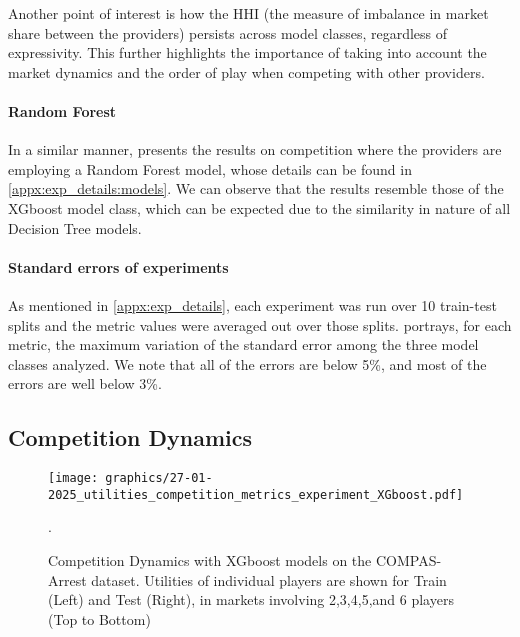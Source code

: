 Another point of interest is how the HHI (the measure of imbalance in market share between the providers) persists across model classes, regardless of expressivity. This further highlights the importance of taking into account the market dynamics and the order of play when competing with other providers.


\paragraph{Random Forest}

In a similar manner,  presents the results on competition where the providers are employing a Random Forest model, whose details can be found in \cref{appx:exp_details:models}.
We can observe that the results resemble those of the XGboost model class, which can be expected due to the similarity in nature of all Decision Tree models. 


\paragraph{Standard errors of experiments}
As mentioned in \cref{appx:exp_details}, each experiment was run over 10 train-test splits and the metric values were averaged out over those splits. 
 portrays, for each metric, the maximum variation of the standard error among the three model classes analyzed.
We note that all of the errors are below 5\%, and most of the errors are well below 3\%.



\subsection{Competition Dynamics}
\begin{figure}[h!]
    \centering
\texttt{[image: graphics/27-01-2025\_utilities\_competition\_metrics\_experiment\_XGboost.pdf]}
    \caption{Competition Dynamics with XGboost models on the COMPAS-Arrest dataset. Utilities of individual players are shown for Train (Left) and Test (Right), in markets involving 2,3,4,5,and 6 players (Top to Bottom)}. 
    \label{fig:cmpt_utils_xgb}
\end{figure}
